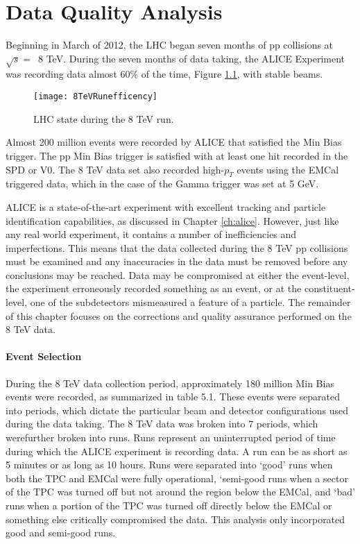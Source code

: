 \chapter{Data Quality Analysis} \label{ch:data}

Beginning in March of 2012, the LHC began seven months of pp collisions at $\sqrt{s} = \,$ 8 TeV. During the seven months of data taking, the ALICE Experiment was recording data almost 60\% of the time, Figure \ref{fig:RunEffer}, with stable beams.

\begin{figure}[h]
\texttt{[image: 8TeVRunefficency]}
\centering
\caption{LHC state during the 8 TeV run. }
\label{fig:RunEffer}
\end{figure}


Almost 200 million events were recorded by ALICE that satisfied the Min Bias trigger.  The pp Min Bias trigger is satisfied with at least one hit recorded in the SPD or V0.  The 8 TeV data set also recorded high-$p_{T}$ events using the EMCal triggered data, which in the case of the Gamma trigger was set at 5 GeV.  


ALICE is a state-of-the-art experiment with excellent tracking and particle identification capabilities, as discussed in Chapter \ref{ch:alice}.  However, just like any real world experiment, it contains a number of inefficiencies and imperfections.  This means that the data collected during the 8 TeV pp collisions must be examined and any inaccuracies in the data must be removed before any conclusions may be reached.  Data may be compromised at either the event-level, the experiment erroneously recorded something as an event, or at the constituent-level, one of the subdetectors mismeasured a feature of a particle.  The remainder of this chapter focuses on the corrections and quality assurance performed on the 8 TeV data.






\subsubsection{Event Selection}

During the 8 TeV data collection period, approximately 180 million Min Bias events were recorded, as summarized in table 5.1.  These events were separated into periods, which dictate the particular beam and detector configurations used during the data taking.  The 8 TeV data was broken into 7 periods, which werefurther broken into runs.  Runs represent an uninterrupted period of time during which the ALICE experiment is recording data. A run can be as short as 5 minutes or as long as 10 hours.  Runs were separated into `good' runs when both the TPC and EMCal were fully operational, `semi-good runs when a sector of the TPC was turned off but not around the region below the EMCal, and `bad' runs when a portion of the TPC was turned off directly below the EMCal or something else critically compromised the data.  This analysis only incorporated good and semi-good runs.

